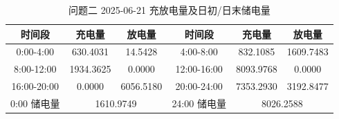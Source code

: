\begin{table}[htbp]
\centering
\caption{问题二 2025-06-21 充放电量及日初/日末储电量}\label{tab:q2-storage}
\normalsize\setlength{\tabcolsep}{5pt}
\begin{tabular}{@{}cccccc@{}}
\toprule
时间段 & 充电量 & 放电量 & 时间段 & 充电量 & 放电量 \\
\midrule
0:00-4:00 & 630.4031 & 14.5428 & 4:00-8:00 & 832.1085 & 1609.7483 \\
8:00-12:00 & 1934.3625 & 0.0000 & 12:00-16:00 & 8093.9768 & 0.0000 \\
16:00-20:00 & 0.0000 & 6056.5180 & 20:00-24:00 & 7353.2930 & 3192.8477 \\
0:00 储电量 & \multicolumn{2}{c}{1610.9749} & 24:00 储电量 & \multicolumn{2}{c}{8026.2588} \\
\bottomrule
\end{tabular}
\end{table}
